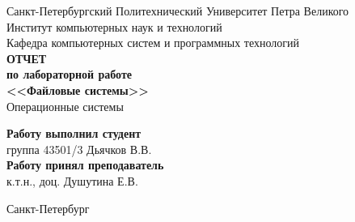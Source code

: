 \begin{titlepage}
\begin{center}
	Санкт-Петербургский Политехнический Университет Петра Великого\\[0.3cm]
	Институт компьютерных наук и технологий \\[0.3cm]
	Кафедра компьютерных систем и программных технологий\\[4cm]
	
	\textbf{ОТЧЕТ}\\ 
	\textbf{по лабораторной работе}\\[0.5cm]
	\textbf{<<Файловые системы>>}\\[0.1cm]
	Операционные системы\\[3.0cm]
\end{center}

\begin{flushright}
	\begin{minipage}{0.5\textwidth}
		\textbf{Работу выполнил студент}\\[3mm]
		группа 43501/3 \hfill Дьячков В.В.\\[5mm]
		\textbf{Работу принял преподаватель}\\[5mm]
		\sign[2cm] \hfill к.т.н., доц. Душутина Е.В. \\[5mm]
	\end{minipage}
\end{flushright}

\vfill

\begin{center}
	Санкт-Петербург\\[0.3cm]
	\the\year
\end{center}
\end{titlepage}

\addtocounter{page}{1}